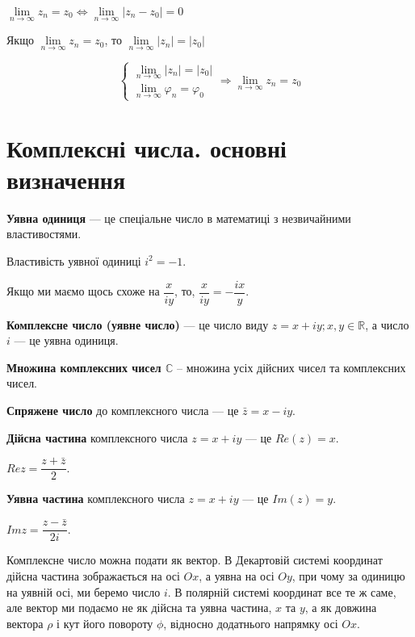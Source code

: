 \begin{claim}
$\lim\limits_{n\rightarrow\infty} z_n = z_0 \Leftrightarrow \lim\limits_{n\rightarrow\infty} |z_n-z_0| = 0$
\end{claim}

\begin{theorem}
Якщо $\lim\limits_{n\rightarrow\infty} z_n = z_0$, то $\lim\limits_{n\rightarrow\infty} |z_n| = |z_0|$
\end{theorem}

\begin{theorem}
$$ 
\left\{ \begin{array}{l}
\lim\limits_{n\rightarrow\infty} |z_n| = |z_0| \\
\lim\limits_{n\rightarrow\infty} \varphi_n = \varphi_0
\end{array}\right.
\Rightarrow \lim\limits_{n\rightarrow\infty} z_n = z_0
$$
\end{theorem}


\section{Комплексні числа. основні визначення}

\textbf{Уявна одиниця} --- це спеціальне число в математиці з незвичайними властивостями.

Властивість уявної одиниці $i^2 = -1$.

Якщо ми маємо щось схоже на $\dfrac{x}{iy}$, то, $\dfrac{x}{iy} = - \dfrac{ix}{y}$.

\textbf{Комплексне число (уявне число)} --- це число виду $z = x + iy; x, y \in \mathbb{R}$,
а число $i$ --- це уявна одиниця.

\textbf{Множина комплексних чисел $\mathbb{C}$} -- множина усіх дійсних чисел та комплексних чисел.

\textbf{Спряжене число} до комплексного числа --- це $\bar z = x - iy$.

\textbf{Дійсна частина} комплексного числа $z = x + iy$ --- це $Re(z) = x$.

$Re z = \dfrac{z + \bar{z}}{2}$.

\textbf{Уявна частина} комплексного числа $z = x + iy$ --- це $Im(z) = y$.

$Im z = \dfrac{z - \bar{z}}{2i}$.

Комплексне число можна подати як вектор.
В Декартовій системі координат дійсна частина зображається на осі $Ox$, а уявна на осі $Oy$, при чому за одиницю на уявній осі, ми беремо число $i$.
В полярній системі координат все те ж саме, але вектор ми подаємо не як дійсна  та уявна частина, $x$ та $y$, а як довжина вектора $\rho$ і кут його повороту $\phi$, відносно додатнього напрямку осі $Ox$.

